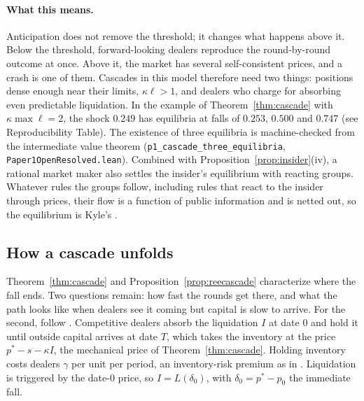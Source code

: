 \documentclass[12pt]{article}
\theoremstyle{definition}
\theoremstyle{remark}
\begin{document}
\paragraph{What this means.} Anticipation does not remove the threshold; it changes what happens above it. Below the threshold, forward-looking dealers reproduce the round-by-round outcome at once. Above it, the market has several self-consistent prices, and a crash is one of them. Cascades in this model therefore need two things: positions dense enough near their limits, $\kappa\ell>1$, and dealers who charge for absorbing even predictable liquidation. In the example of Theorem~\ref{thm:cascade} with $\kappa\max\ell=2$, the shock $0.249$ has equilibria at falls of $0.253$, $0.500$ and $0.747$ (see Reproducibility Table). The existence of three equilibria is machine-checked from the intermediate value theorem (\texttt{p1\_cascade\_three\_equilibria}, \nolinkurl{Paper1OpenResolved.lean}). Combined with Proposition~\ref{prop:insider}(iv), a rational market maker also settles the insider's equilibrium with reacting groups. Whatever rules the groups follow, including rules that react to the insider through prices, their flow is a function of public information and is netted out, so the equilibrium is Kyle's \citep{kyle1985}.

\subsection{How a cascade unfolds}

Theorem~\ref{thm:cascade} and Proposition~\ref{prop:reecascade} characterize where the fall ends. Two questions remain: how fast the rounds get there, and what the path looks like when dealers see it coming but capital is slow to arrive. For the second, follow \citet{duffie2010}. Competitive dealers absorb the liquidation $I$ at date $0$ and hold it until outside capital arrives at date $T$, which takes the inventory at the price $p^*-s-\kappa I$, the mechanical price of Theorem~\ref{thm:cascade}. Holding inventory costs dealers $\gamma$ per unit per period, an inventory-risk premium as in \citet{grossman1988}. Liquidation is triggered by the date-$0$ price, so $I=L(\delta_0)$, with $\delta_0=p^*-p_0$ the immediate fall.
\end{document}
